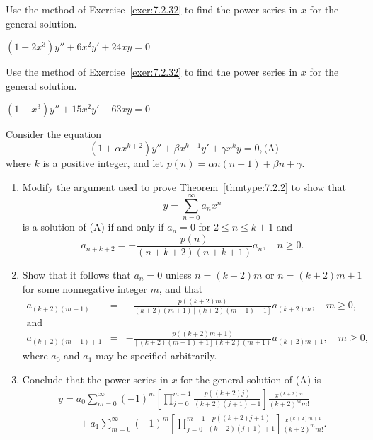 \documentclass{ximera}
\begin{document}
\begin{problem}\label{exer:7.2.36}
Use the method of
Exercise~\ref{exer:7.2.32}  to find the power series in
$x$ for the general solution.

$(1-2x^3)y''+6x^2y'+24xy=0$
\end{problem}

 \begin{problem}\label{exer:7.2.37}
 Use the method of
Exercise~\ref{exer:7.2.32}  to find the power series in
$x$ for the general solution.

$(1-x^3)y''+15x^2y'-63xy=0$
\end{problem}

\begin{problem}\label{exer:7.2.38}
Consider the equation
$$
\left(1+\alpha x^{k+2}\right)y''+\beta x^{k+1}y'+\gamma x^ky=0,
\text{(A)}
$$
where $k$ is a positive integer,
and let
$p(n)=\alpha n(n-1)+\beta n+\gamma$.
\begin{enumerate}
\item %
Modify the argument used to prove Theorem~\ref{thmtype:7.2.2} to show that
$$
y=\sum_{n=0}^\infty a_nx^n
$$
  is a solution of
(A)  if and only if  $a_n=0$ for $2\le n\le k+1$ and
$$
a_{n+k+2}=-\frac{p(n)}{(n+k+2)(n+k+1)}a_n,\quad n\ge0.
$$
\item %
Show that it follows that $a_n=0$  unless $n=(k+2)m$  or $n=(k+2)m+1$
for some nonnegative integer $m$, and that
\begin{eqnarray*}
a_{(k+2)(m+1)}&=&-\frac{p\left((k+2)m\right)}{(k+2)(m+1)[(k+2)(m+1)-1]}a_{(k+2)m},\quad m\ge
0, \\
\mbox{and}\\
a_{(k+2)(m+1)+1}&=&-\frac{p\left((k+2)m+1\right)}{[(k+2)(m+1)+1](k+2)(m+1)}
a_{(k+2)m+1},\quad m\ge0,
\end{eqnarray*}
where $a_0$ and $a_1$ may be specified arbitrarily.
\item %
Conclude that the  power series in $x$ for the general solution
of (A) is
$$
\begin{array}{l}
y=a_0\sum^\infty_{m=0}(-1)^m \left[\prod^{m-1}_{j=0}
\frac{p\left((k+2)j\right)}{(k+2)(j+1)-1}\right] \frac{x^{(k+2)m}}{(k+2)^m
m!}\\ 
\qquad+a_1\sum^\infty_{m=0}(-1)^m
\left[\prod^{m-1}_{j=0}\frac{p\left((k+2)j+1\right)}{(k+2)(j+1)+1}\right]
\frac{x^{(k+2)m+1}}{(k+2)^mm!}.
\end{array}
$$
\end{enumerate}
\end{problem}
\end{document}
